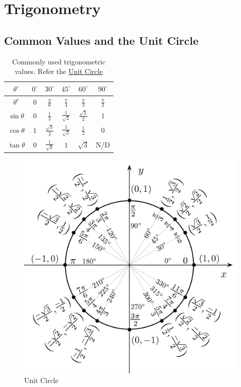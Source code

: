 \documentclass[12pt]{article}
\begin{document}
\section{Trigonometry}

\subsection{Common Values and the Unit Circle}
\begin{table}[H]
	\centering
	\renewcommand{\arraystretch}{1.5}
	\begin{tabular}{cccccc}
		\toprule
		$\theta ^ \circ$ & $0^ \circ$ & $30^ \circ$ & $45^ \circ$ & $60^ \circ$ & $90^ \circ$ \\ \midrule
		$\theta ^ c$ & $0$ & $\frac{\pi}{6}$ & $\frac{\pi}{4}$ & $\frac{\pi}{3}$ & $\frac{\pi}{2}$ \\ \midrule
		$\sin \theta$ & $0$ & $\frac{1}{2}$ & $\frac{1}{\sqrt{2}}$ & $\frac{\sqrt{3}}{2}$ & $1$ \\
		$\cos \theta$ & $1$ & $\frac{\sqrt{3}}{2}$ & $\frac{1}{\sqrt{2}}$ & $\frac{1}{2}$ & $0$ \\
		$\tan \theta$ & 0 & $\frac{1}{\sqrt{3}}$ & $1$ & $\sqrt{3}$ & N/D \\ \bottomrule
	\end{tabular}
	\caption{\label{standardvals}Commonly used trigonometric values. Refer the \hyperref[unitcircle]{Unit Circle}}
\end{table}
\begin{figure}[ht]
	\centering
	\includegraphics[scale=0.8]{Unit_circle_angles.pdf}
	\caption{\label{unitcircle} Unit Circle}
\end{figure}
\end{document}

